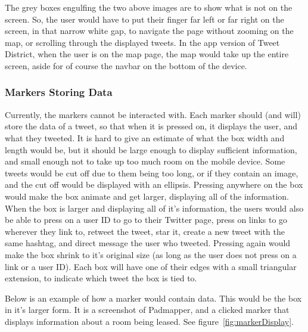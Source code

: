 \documentclass[11pt]{article}
\begin{document}
The grey boxes engulfing the two above images are to show what is not on the screen. So, the user would have to put their finger far left or far right on the screen, in that narrow white gap, to navigate the page without zooming on the map, or scrolling through the displayed tweets. In the app version of Tweet District, when the user is on the map page, the map would take up the entire screen, aside for of course the navbar on the bottom of the device.

\subsubsection{Markers Storing Data}
Currently, the markers cannot be interacted with. Each marker should (and will) store the data of a tweet, so that when it is pressed on, it displays the user, and what they tweeted. It is hard to give an estimate of what the box width and length would be, but it should be large enough to display sufficient information, and small enough not to take up too much room on the mobile device. Some tweets would be cut off due to them being too long, or if they contain an image, and the cut off would be displayed with an ellipsis. Pressing anywhere on the box would make the box animate and get larger, displaying all of the information. When the box is larger and displaying all of it's information, the users would also be able to press on a user ID to go to their Twitter page, press on links to go wherever they link to, retweet the tweet, star it, create a new tweet with the same hashtag, and direct message the user who tweeted. Pressing again would make the box shrink to it's original size (as long as the user does not press on a link or a user ID). Each box will have one of their edges with a small triangular extension, to indicate which tweet the box is tied to.

Below is an example of how a marker would contain data. This would be the box in it's larger form. It is a screenshot of Padmapper, and a clicked marker that displays information about a room being leased. See figure~\ref{fig:markerDisplay}.
\end{document}
